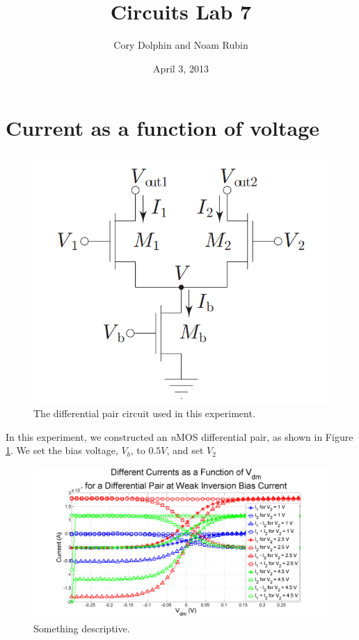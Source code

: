 \documentclass{article}
\title{Circuits Lab 7}
\author{Cory Dolphin and Noam Rubin}
\date{April 3, 2013}
\newcommand{\Vb}{{$V_{b}$}}
\newcommand{\nMOS}{{\textit{n}MOS }}
\begin{document}
\maketitle

\section*{Current as a function of voltage}
\begin{figure}[H]
\centering
\includegraphics[width=0.65\linewidth]{./Figures/Schematic.png}
\caption{The differential pair circuit used in this experiment.}
\label{fig:Schematic}
\end{figure}

In this experiment, we constructed an \nMOS differential pair, as shown in Figure \ref{fig:Schematic}. We set the bias voltage, \Vb, to $0.5V$, and set $V_2$



\begin{figure}[H]
\centering
\includegraphics[width=\linewidth]{./Figures/AllCurrentsOneFigure}
\caption{Something descriptive. }
\label{fig:AllCurrentsOneFigure }
\end{figure}
\end{document}
